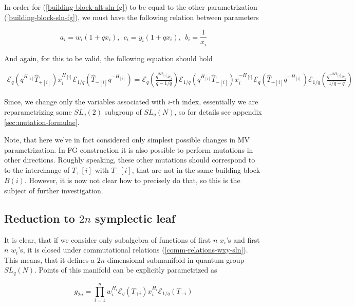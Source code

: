 \documentclass{article}
\newcommand{\lb}{\left (}
\newcommand{\rb}{\right )}
\newcommand{\B}[1]{\lb #1 \rb}
\newcommand{\lsb}{\left [}
\newcommand{\rsb}{\right ]}
\newcommand{\SB}[1]{\lsb #1 \rsb}
\newcommand {\?}{\textit{???}}
\newcommand{\me}[0]{\mathcal{E}}
\newcommand{\hT}[0]{\hat{T}}
\newcommand{\Tp}[1][]{T_{+ #1}}
\newcommand{\Tm}[1][]{T_{- #1}}
\newcommand{\delabel}[1]{(\ref{#1})}
\begin{document}
In order for \delabel{building-block-alt-sln-fg} to be equal to the other parametrization
 \delabel{building-block-sln-fg}, we must have the following relation between parameters

\begin{equation}
a_i = w_i (1 + q x_i),\ \ c_i = y_i ( 1 + q x_i), \ \ b_i = \frac{1}{x_i}
\end{equation}

And again, for this to be valid, the following equation should hold

\begin{align}
\label{mutation-sl2-main-equation}
\me_q(q^{H_{\SB{i}}} \hT_{+ \SB{i}})
x_i^{H_{\SB{i}}}
\me_{1/q}(\hT_{- \SB{i}} q^{-H_{\SB{i}}})
= \me_q\lb \frac{q^{2H_{\SB{i}}} x_i}{q - 1/q}\rb \me_{1/q}(q^{H_{\SB{i}}} \hT_{-\SB{i}})
x_i^{-H_{\SB{i}}}
\me_{q}(\hT_{+ \SB{i}} q^{-H_{\SB{i}}}) \me_{1/q}\lb \frac{q^{-2H_{\SB{i}}} x_i}{1/q - q}\rb
\end{align}

Since, we change only the variables associated with $i$-th index,
 essentially we are reparametrizing some $SL_q(2)$ subgroup of $SL_q(N)$,
so for details see appendix \ref{sec:mutation-formulae}.


Note, that here we've in fact considered only simplest possible changes
in MV parametrization. In FG construction it is also possible to perform mutations
in other directions. Roughly speaking, these other mutations should correspond to
to the interchange of $\Tp{\SB{i}}$ with $\Tm{\SB{i}}$, that are not in the same building block $B(i)$.
 However, it is now not clear how to precisely do that, so this is the subject of
further investigation.


\subsection{Reduction to $2n$ symplectic leaf}

It is clear, that if we consider only subalgebra of functions of first $n$ $x_i$'s and first $n$ $w_i$'s,
it is closed under commutational relations \delabel{comm-relations-wxy-sln}. This means,
that it defines a $2n$-dimensional submanifold in quantum group $SL_q(N)$.
Points of this manifold can be explicitly parametrized as

\begin{equation}
g_{2n} = \prod_{i = 1}^n w_i^{H_{i}} \me_q \B{\Tp[i]} x_i^{H_{i}} \me_{1/q} \B{\Tm[i]}
\end{equation}
\end{document}
